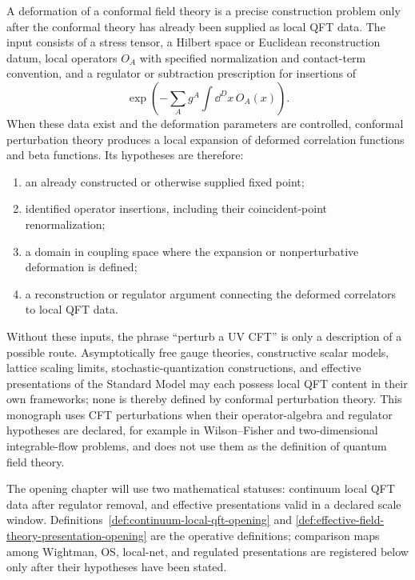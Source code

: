 \begin{remark}
\label{rem:opening-cft-perturbation-scope}
A deformation of a conformal field theory is a precise construction problem
only after the conformal theory has already been supplied as local QFT data.
The input consists of a stress tensor, a Hilbert space or Euclidean
reconstruction datum, local operators \(O_A\) with specified normalization and
contact-term convention, and a regulator or subtraction prescription for
insertions of
\[
  \exp\!\left(-\sum_A g^A\int\dd^Dx\,O_A(x)\right).
\]
When these data exist and the deformation parameters are controlled, conformal
perturbation theory produces a local expansion of deformed correlation
functions and beta functions.  Its hypotheses are therefore:
\begin{enumerate}
  \item an already constructed or otherwise supplied fixed point;
  \item identified operator insertions, including their coincident-point
  renormalization;
  \item a domain in coupling space where the expansion or nonperturbative
  deformation is defined;
  \item a reconstruction or regulator argument connecting the deformed
  correlators to local QFT data.
\end{enumerate}
Without these inputs, the phrase ``perturb a UV CFT'' is only a description
of a possible route.  Asymptotically free gauge theories, constructive scalar
models, lattice scaling limits, stochastic-quantization constructions, and
effective presentations of the Standard Model may each possess local QFT
content in their own frameworks; none is thereby defined by conformal
perturbation theory.  This monograph uses CFT perturbations when their
operator-algebra and regulator hypotheses are declared, for example in
Wilson--Fisher and two-dimensional integrable-flow problems, and does not use
them as the definition of quantum field theory.
\end{remark}

The opening chapter will use two mathematical statuses: continuum local QFT
data after regulator removal, and effective presentations valid in a declared
scale window.  Definitions~\ref{def:continuum-local-qft-opening} and
\ref{def:effective-field-theory-presentation-opening} are the operative definitions;
comparison maps among Wightman, OS, local-net, and regulated presentations are
registered below only after their hypotheses have been stated.

